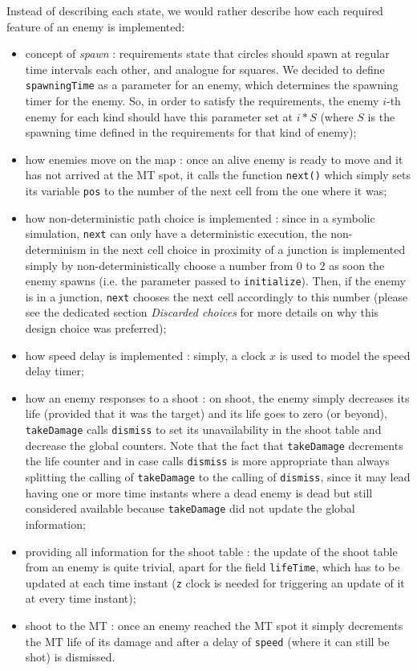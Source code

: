\documentclass[
10pt, %
a4paper, %
oneside, %
headinclude,footinclude, %
BCOR5mm, %
]{scrartcl}
\begin{document}
	Instead of describing each state, we would rather describe how each required feature of an enemy is implemented:
	\begin{itemize}
		\item concept of \emph{spawn} : requirements state that circles should spawn at regular time intervals each other, and analogue for squares. We decided to define \texttt{spawningTime} as a parameter for an enemy, which determines the spawning timer for the enemy. So, in order to satisfy the requirements, the enemy $i$-th enemy for each kind should have this parameter set at $i*S$ (where $S$ is the spawning time defined in the requirements for that kind of enemy);
		\item how enemies move on the map : once an alive enemy is ready to move and it has not arrived at the MT spot, it calls the function \texttt{next()} which simply sets its variable \texttt{pos} to the number of the next cell from the one where it was;
		\item how non-deterministic path choice is implemented : since in a symbolic simulation, \texttt{next} can only have a deterministic execution, the non-determinism in the next cell choice in proximity of a junction is implemented simply by non-deterministically choose a number from $0$ to $2$ as soon the enemy spawns (i.e. the parameter passed to \texttt{initialize}). Then, if the enemy is in a junction, \texttt{next} chooses the next cell accordingly to this number (please see the dedicated section \emph{Discarded choices} for more details on why this design choice was preferred);
		\item how speed delay is implemented : simply, a clock $x$ is used to model the speed delay timer;
		\item how an enemy responses to a shoot : on shoot, the enemy simply decreases its life (provided that it was the target) and its life goes to zero (or beyond), \texttt{takeDamage} calls \texttt{dismiss} to set its unavailability in the shoot table and decrease the global counters. Note that the fact that \texttt{takeDamage} decrements the life counter and in case calls \texttt{dismiss} is more appropriate than always splitting the calling of \texttt{takeDamage} to the calling of \texttt{dismiss}, since it may lead having one or more time instants where a dead enemy is dead but still considered available because \texttt{takeDamage} did not update the global information;
		\item providing all information for the shoot table : the update of the shoot table from an enemy is quite trivial, apart for the field \texttt{lifeTime}, which has to be updated at each time instant (\texttt{z} clock is needed for triggering an update of it at every time instant);
		\item shoot to the MT : once an enemy reached the MT spot it simply decrements the MT life of its damage and after a delay of \texttt{speed} (where it can still be shot) is dismissed.
	\end{itemize}
	
\end{document}
